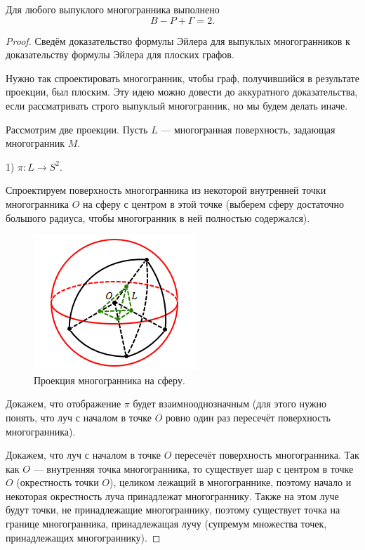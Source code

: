 \begin{theorem}
    Для любого выпуклого многогранника выполнено \[B - P + \Gamma = 2.\]
\end{theorem}
\begin{proof}
    Сведём доказательство формулы Эйлера для выпуклых многогранников к доказательству формулы Эйлера для плоских графов.

    Нужно так спроектировать многогранник, чтобы граф, получившийся в результате проекции, был плоским. Эту идею можно довести до аккуратного доказательства, если рассматривать строго выпуклый многогранник, но мы будем делать иначе.

    Рассмотрим две проекции. Пусть $L$ — многогранная поверхность, задающая многогранник $M$.

    1) $\pi: L \to S^2$.

    Спроектируем поверхность многогранника из некоторой внутренней точки многогранника $O$ на сферу с центром в этой точке (выберем сферу достаточно большого радиуса, чтобы многогранник в ней полностью содержался).

    \begin{figure}[h]
        \centering
        \includegraphics[scale=0.8]{images/c7.2.png}
        \caption{Проекция многогранника на сферу.}
        \label{fig:c7.2}
    \end{figure}

    Докажем, что отображение $\pi$ будет взаимнооднозначным (для этого нужно понять, что луч с началом в точке $O$ ровно один раз пересечёт поверхность многогранника).

    Докажем, что луч с началом в точке $O$ пересечёт поверхность многогранника. Так как $O$ — внутренняя точка многогранника, то существует шар с центром в точке $O$ (окрестность точки $O$), целиком лежащий в многограннике, поэтому начало и некоторая окрестность луча принадлежат многограннику. Также на этом луче будут точки, не принадлежащие многограннику, поэтому существует точка на границе многогранника, принадлежащая лучу (супремум множества точек, принадлежащих многограннику).


\end{proof}
